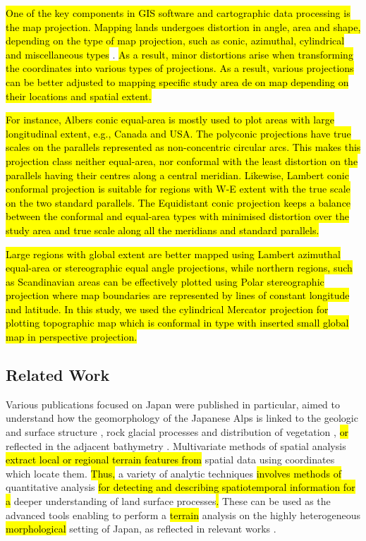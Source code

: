 \documentclass[land,article,submit,pdftex,moreauthors]{Definitions/mdpi}
\begin{document}
\hl{One of the key components in GIS software and cartographic data processing is the map projection. Mapping lands undergoes distortion in angle, area and shape, depending on the type of map projection, such as conic, azimuthal, cylindrical and miscellaneous types} \cite{Ghaderpour}. \hl{As a result, minor distortions arise when transforming the coordinates into various types of projections. As a result, various projections can be better adjusted to mapping specific study area de on map depending on their locations and spatial extent.} 

\hl{For instance, Albers conic equal-area is mostly used to plot areas with large longitudinal extent, e.g., Canada and USA. The polyconic projections have true scales on the parallels represented as non-concentric circular arcs. This makes this projection class neither equal-area, nor conformal with the least distortion on the parallels having their centres along a central meridian. Likewise, Lambert conic conformal projection is suitable for regions with W-E extent with the true scale on the two standard parallels. The Equidistant conic projection keeps a balance between the conformal and equal-area types with minimised distortion over the study area and true scale along all the meridians and standard parallels.} 

\hl{Large regions with global extent are better mapped using Lambert azimuthal equal-area or stereographic equal angle projections, while northern regions, such as Scandinavian areas can be effectively plotted using Polar stereographic projection where map boundaries are represented by lines of constant longitude and latitude. In this study, we used the cylindrical Mercator projection for plotting topographic map which is conformal in type with inserted small global map in perspective projection.}

\subsection{Related Work}

Various publications focused on Japan were published in particular, aimed to understand how the geomorphology of the\hl{ }Japanese Alps is linked to the\hl{ }geologic and surface structure \cite{MATSUOKA201965}, rock glacial processes and distribution of vegetation \cite{FUJINO2023100146}, \hl{or} reflected in the adjacent bathymetry \cite{Kariya2002}. Multivariate methods of spatial analysis \hl{extract local or regional terrain features from } spatial data using coordinates which locate them. \hl{Thus, }a variety of analytic techniques \hl{involves methods of} quantitative analysis \hl{for detecting and describing spatiotemporal information for a }deeper understanding of land surface processes\hl{. }These can be used as the advanced tools enabling to perform a \hl{terrain} analysis on the highly heterogeneous \hl{morphological} setting of Japan, as reflected in\hl{ }relevant works \cite{Oguchi2000,OGUCHI2020106805,MATSUURA2015133,NIWA2021107835,HATTANJI2021107943}. 
\end{document}
